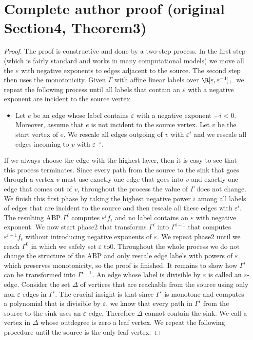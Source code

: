 \section*{Complete author proof (original Section4, Theorem3)}
\begin{proof}
The proof is constructive and done by a two-step process. In the first step (which is fairly standard and works in many computational models) we move all the $\varepsilon$ with negative exponents to edges adjacent to the source. The second step then uses the monotonicity.
Given $\Gamma$ with affine linear labels over $\R[\varepsilon,\varepsilon^{-1}]_+$ we repeat the following process until all labels that contain an $\varepsilon$ with a negative exponent are incident to the source vertex.
\begin{itemize}
\item Let $e$ be an edge whose label contains $\varepsilon$ with a negative exponent $-i<0$. Moreover, assume that $e$ is not incident to the source vertex. Let $v$ be the start vertex of $e$. We rescale all edges outgoing of $v$ with $\varepsilon^i$ and we rescale all edges incoming to $v$ with $\varepsilon^{-i}$.
\end{itemize}
If we always choose the edge with the highest layer, then it is easy to see that this process terminates. Since every path from the source to the sink that goes through a vertex $v$ must use exactly one edge that goes into $v$ and exactly one edge that comes out of $v$, throughout the process the value of $\Gamma$ does not change. We finish this first phase by taking the highest negative power $i$ among all labels of edges that are incident to the source and then rescale all these edges with $\varepsilon^i$. The resulting ABP $\Gamma^i$ computes $\varepsilon^if_\epsilon$ and no label contains an $\varepsilon$ with negative exponent. We now start phase2 that transforms $\Gamma^i$ into $\Gamma^{i-1}$ that computes $\varepsilon^{i-1}f_\epsilon$ without introducing negative exponents of $\varepsilon$. We repeat phase2 until we reach $\Gamma^0$ in which we safely set $\varepsilon$ to0. Throughout the whole process we do not change the structure of the ABP and only rescale edge labels with powers of $\varepsilon$, which preserves monotonicity, so the proof is finished. It remains to show how $\Gamma^i$ can be transformed into $\Gamma^{i-1}$. An edge whose label is divisible by $\varepsilon$ is called an $\varepsilon$-edge. Consider the set $\Delta$ of vertices that are reachable from the source using only non $\varepsilon$-edges in $\Gamma^i$. The crucial insight is that since $\Gamma^i$ is monotone and computes a polynomial that is divisible by $\varepsilon$, we know that every path in $\Gamma^i$ from the source to the sink uses an $\varepsilon$-edge. Therefore $\Delta$ cannot contain the sink. We call a vertex in $\Delta$ whose outdegree is zero a leaf vertex. We repeat the following procedure until the source is the only leaf vertex:

\end{proof}
